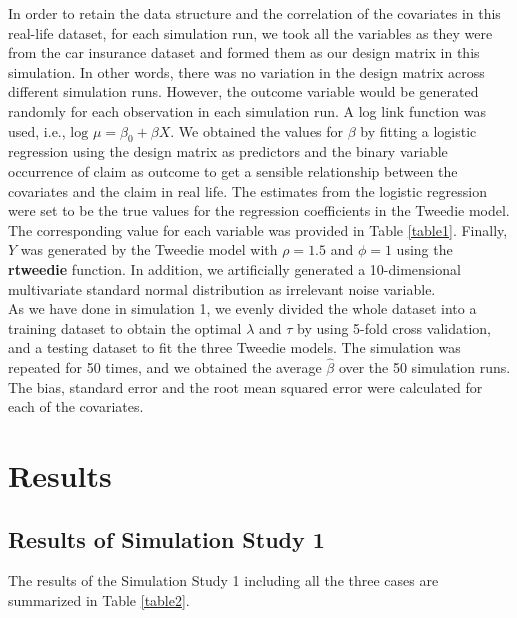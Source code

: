 \documentclass[paper=a4, fontsize=11pt]{scrartcl} %
\begin{document}
In order to retain the data structure and the correlation of the covariates in this real-life dataset, for each simulation run, we took all the variables as they were from the car insurance dataset and formed them as our design matrix in this simulation. In other words, there was no variation in the design matrix across different simulation runs. However, the outcome variable would be generated randomly for each observation in each simulation run. A log link function was used, i.e., $\textrm{log }\mu =\beta_{0}+\beta X$. We obtained the values for $\beta$ by fitting a logistic regression using the design matrix as predictors and the binary variable occurrence of claim as outcome to get a sensible relationship between the covariates and the claim in real life. The estimates from the logistic regression were set to be the true values for the regression coefficients in the Tweedie model. The corresponding value for each variable was provided in Table \ref{table1}. Finally, $Y$ was generated by the Tweedie model with $\rho=1.5$ and $\phi=1$ using the \textbf{rtweedie} function. In addition, we artificially generated a 10-dimensional multivariate standard normal distribution as irrelevant noise variable. \\

As we have done in simulation 1, we evenly divided the whole dataset into a training dataset to obtain the optimal $\lambda$ and $\tau$ by using 5-fold cross validation, and a testing dataset to fit the three Tweedie models. The simulation was repeated for 50 times, and we obtained the average $\hat{\beta}$ over the 50 simulation runs. The bias, standard error and the root mean squared error were calculated for each of the covariates.\\


\section*{\textbf{Results}}

\subsection*{\textbf{Results of Simulation Study 1}}
The results of the Simulation Study 1 including all the three cases are summarized in Table \ref{table2}. \\
\end{document}
